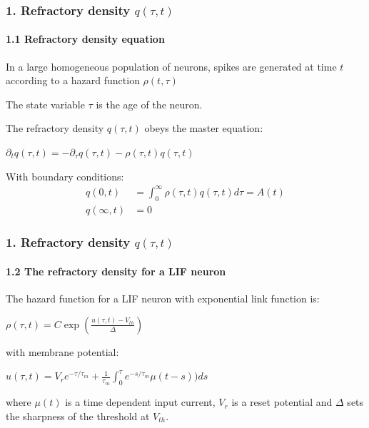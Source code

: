 \documentclass{beamer}
\begin{document}
\begin{frame}
\frametitle{1. Refractory density $q(\tau,t)$}
\framesubtitle{1.1 Refractory density equation}

In a large homogeneous population of neurons, spikes are generated at time $t$ according to a hazard function $\rho(t,\tau)$

\vspace{0.3cm}
\pause
The state variable $\tau$ is the age of the neuron.

\vspace{0.3cm}
\pause
The refractory density $q(\tau,t)$ obeys the master equation:

\vspace{0.3cm}
\hspace{2.5cm}$
\partial_t q(\tau,t)=-\partial_\tau q(\tau,t)-\rho(\tau,t)q(\tau,t)
$

\pause
\vspace{0.3cm}
With boundary conditions:
\begin{align}
\label{boundarycondition}
q(0,t)&=\int_{0}^{\infty}\rho(\tau,t)q(\tau,t)d\tau=A(t) \nonumber\\
q(\infty,t)&=0 \nonumber
\end{align}

\end{frame}


\begin{frame}
\frametitle{1. Refractory density $q(\tau,t)$}
\framesubtitle{1.2 The refractory density for a LIF neuron}
The hazard function for a LIF neuron with exponential link function is:

\vspace{0.1cm}
\hspace{3cm}$\rho(\tau,t)=C\exp(\frac{u(\tau,t)-V_{th}}{\Delta})$

\vspace{0.4cm}
with membrane potential:

\vspace{0.1cm}
\hspace{1.6cm} $u(\tau,t)=V_r e^{-\tau/\tau_m}+\frac{1}{\tau_m}\int_0^\tau  e^{-s/\tau_m}\mu(t-s))ds$

\vspace{0.4cm}
where $\mu(t)$ is a time dependent input current, $V_r$ is a reset potential and $\Delta$ sets the sharpness of the threshold at $V_{th}$.

\end{frame}
\end{document}
